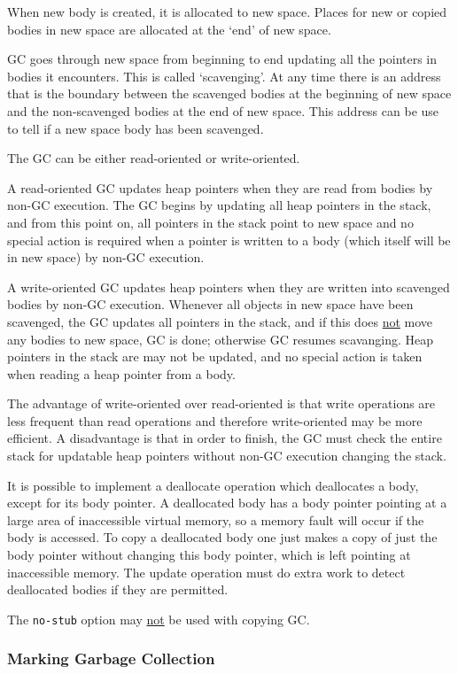 \documentclass[12pt]{article}
\begin{document}
When new body is created, it is allocated to new space.
Places for new or copied bodies in new space are
allocated at the `end' of new space.

GC goes through new space from beginning to end updating
all the pointers in bodies it encounters.  This is called
`scavenging'.  At any time there is an address that is the
boundary between the scavenged bodies at the beginning
of new space and the non-scavenged bodies at the end of
new space.  This address can be use to tell if a new space
body has been scavenged.

The GC can be either read-oriented or write-oriented.

A read-oriented GC updates heap pointers when they are read
from bodies by non-GC execution.
The GC begins by updating all heap pointers in the
stack, and from this point on, all pointers in the stack
point to new space and no special action is required when
a pointer is written to a body (which itself will be in new
space) by non-GC execution.

A write-oriented GC updates heap pointers when they are
written into scavenged bodies by non-GC execution. 
Whenever all objects in new space have been scavenged,
the GC updates all pointers in the stack, and if this does \underline{not}
move any bodies to new space, GC is done; otherwise
GC resumes scavanging.  Heap pointers in the stack are
may not be updated, and no special action is taken
when reading a heap pointer from a body.

The advantage of write-oriented over read-oriented is
that write operations are less frequent than read
operations and therefore write-oriented may be more
efficient.  A disadvantage is that in order to finish, the GC
must check the entire stack for updatable heap pointers
without non-GC execution changing the stack.

It is possible to implement a deallocate operation
which deallocates a body, except for its body pointer.
A deallocated body has a body pointer pointing at
a large area of inaccessible virtual memory, so a
memory fault will occur if the body is accessed.
To copy a deallocated body one just makes a copy
of just the body pointer without changing this body pointer,
which is left pointing at inaccessible memory.
The update operation must do extra work to detect
deallocated bodies if they are permitted.

The {\tt no-stub} option may \underline{not} be used with
copying GC.

\subsubsection{Marking Garbage Collection}
\end{document}
